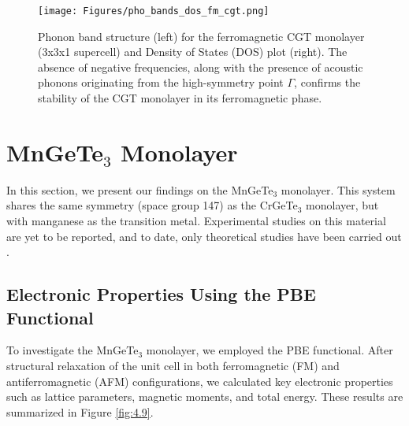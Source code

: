 \begin{figure}[H]
	\centering
	\texttt{[image: Figures/pho\_bands\_dos\_fm\_cgt.png]}
	\caption{Phonon band structure (left) for the ferromagnetic CGT monolayer (3x3x1 supercell) and Density of States (DOS) plot (right). The absence of negative frequencies, along with the presence of acoustic phonons originating from the high-symmetry point $\Gamma$, confirms the stability of the CGT monolayer in its ferromagnetic phase.}
	\label{fig:4.8}
\end{figure}

\section{MnGeTe\texorpdfstring{$_3$}{} Monolayer}
In this section, we present our findings on the MnGeTe$_3$ monolayer. This system shares the same symmetry (space group 147) as the CrGeTe$_3$ monolayer, but with manganese as the transition metal. Experimental studies on this material are yet to be reported, and to date, only theoretical studies have been carried out \supercite{Chittari2020, Song2023, Hao2021}.

\subsection{Electronic Properties Using the PBE Functional}
To investigate the MnGeTe$_3$ monolayer, we employed the PBE functional. After structural relaxation of the unit cell in both ferromagnetic (FM) and antiferromagnetic (AFM) configurations, we calculated key electronic properties such as lattice parameters, magnetic moments, and total energy. These results are summarized in Figure \ref{fig:4.9}.

